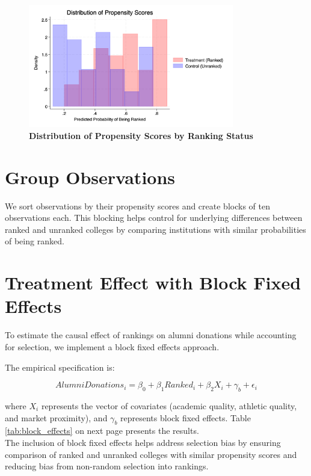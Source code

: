 \documentclass[12pt]{article}
\begin{document}
\begin{figure}[H]
    \centering
    \includegraphics[width=0.8\textwidth]{propensity_distribution.png}
    \caption{\textbf{Distribution of Propensity Scores by Ranking Status}}
    \label{fig:prop_dist}
\end{figure}

\section{Group Observations}

We sort observations by their propensity scores and create blocks of ten observations each. This blocking helps control for underlying differences between ranked and unranked colleges by comparing institutions with similar probabilities of being ranked.

\section{Treatment Effect with Block Fixed Effects}

To estimate the causal effect of rankings on alumni donations while accounting for selection, we implement a block fixed effects approach. 

The empirical specification is:

\begin{equation}
AlumniDonations_i = \beta_0 + \beta_1 Ranked_i + \beta_2 X_i + \gamma_b + \epsilon_i
\end{equation}

where $X_i$ represents the vector of covariates (academic quality, athletic quality, and market proximity), and $\gamma_b$ represents block fixed effects. Table \ref{tab:block_effects} on next page presents the results.\\

The inclusion of block fixed effects helps address selection bias by ensuring comparison of ranked and unranked colleges with similar propensity scores and reducing bias from non-random selection into rankings.\\
\end{document}
